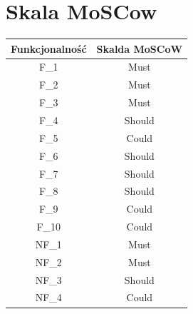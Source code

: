 \documentclass[12pt,titlepage]{article}
\begin{document}
\section{Skala MoSCow}
\begin{center}
    \centering
    \begin{table}[!h]
        \begin{tabular}{|c|c|}
            \hline
            \textbf{Funkcjonalność} & \textbf{Skalda MoSCoW} \\ \hline
            F\_1                    & Must                   \\ \hline
            F\_2                    & Must                   \\ \hline
            F\_3                    & Must                   \\ \hline
            F\_4                    & Should                 \\ \hline
            F\_5                    & Could                  \\ \hline
            F\_6                    & Should                 \\ \hline
            F\_7                    & Should                 \\ \hline
            F\_8                    & Should                 \\ \hline
            F\_9                    & Could                  \\ \hline
            F\_10                   & Could                  \\ \hline
            NF\_1                   & Must                   \\ \hline
            NF\_2                   & Must                   \\ \hline
            NF\_3                   & Should                 \\ \hline
            NF\_4                   & Could                  \\ \hline
        \end{tabular}
    \end{table}
\end{center}

    
\end{document}
